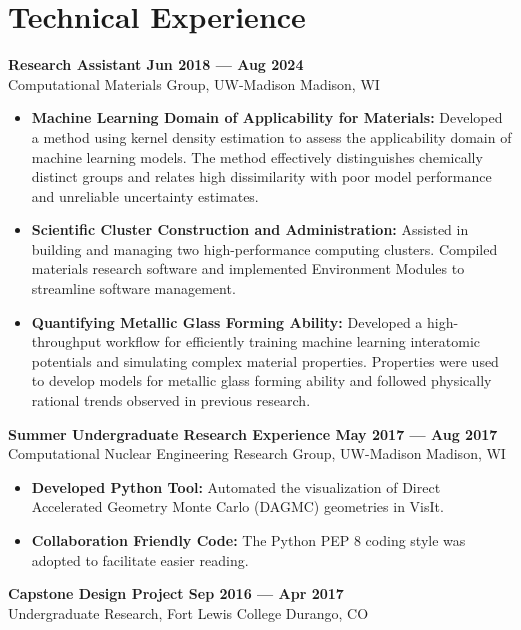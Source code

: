 \section{Technical Experience}

\noindent \textbf{Research Assistant \hfill Jun 2018 --- Aug 2024}\\
Computational Materials Group, UW-Madison \dotfill Madison, WI

\begin{itemize}
    \item \textbf{Machine Learning Domain of Applicability for Materials:} Developed a method using kernel density estimation to assess the applicability domain of machine learning models. The method effectively distinguishes chemically distinct groups and relates high dissimilarity with poor model performance and unreliable uncertainty estimates.

    \item \textbf{Scientific Cluster Construction and Administration:} Assisted in building and managing two high-performance computing clusters. Compiled materials research software and implemented Environment Modules to streamline software management.

    \item \textbf{Quantifying Metallic Glass Forming Ability:} Developed a high-throughput workflow for efficiently training machine learning interatomic potentials and simulating complex material properties. Properties were used to develop models for metallic glass forming ability and followed physically rational trends observed in previous research.

\end{itemize}

\noindent \textbf{Summer Undergraduate Research Experience \hfill May 2017 --- Aug 2017}\\
Computational Nuclear Engineering Research Group, UW-Madison \dotfill Madison, WI

\begin{itemize}
    \item \textbf{Developed Python Tool:} Automated the visualization of Direct Accelerated Geometry Monte Carlo (DAGMC) geometries in VisIt.
    \item \textbf{Collaboration Friendly Code:} The Python PEP 8 coding style was adopted to facilitate easier reading.
\end{itemize}

\noindent \textbf{Capstone Design Project \hfill Sep 2016 --- Apr 2017}\\
Undergraduate Research, Fort Lewis College \dotfill Durango, CO

